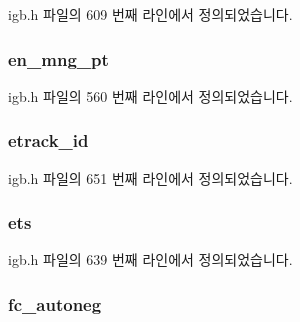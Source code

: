 igb.\+h 파일의 609 번째 라인에서 정의되었습니다.

\subsubsection[{\texorpdfstring{en\+\_\+mng\+\_\+pt}{en_mng_pt}}]{ en\+\_\+mng\+\_\+pt}\hypertarget{structigb__adapter_ac0396f5a94edbdfc286d7e6fc27550b7}{}\label{structigb__adapter_ac0396f5a94edbdfc286d7e6fc27550b7}


igb.\+h 파일의 560 번째 라인에서 정의되었습니다.

\subsubsection[{\texorpdfstring{etrack\+\_\+id}{etrack_id}}]{ etrack\+\_\+id}\hypertarget{structigb__adapter_a9025df95cb081ea9caf184460b72fd62}{}\label{structigb__adapter_a9025df95cb081ea9caf184460b72fd62}


igb.\+h 파일의 651 번째 라인에서 정의되었습니다.

\subsubsection[{\texorpdfstring{ets}{ets}}]{ ets}\hypertarget{structigb__adapter_a3bc8f190a1e1a1b9e800e08506228d80}{}\label{structigb__adapter_a3bc8f190a1e1a1b9e800e08506228d80}


igb.\+h 파일의 639 번째 라인에서 정의되었습니다.

\subsubsection[{\texorpdfstring{fc\+\_\+autoneg}{fc_autoneg}}]{ fc\+\_\+autoneg}\hypertarget{structigb__adapter_ae7d0017e4cc507a6798307136ec9d6aa}{}\label{structigb__adapter_ae7d0017e4cc507a6798307136ec9d6aa}


